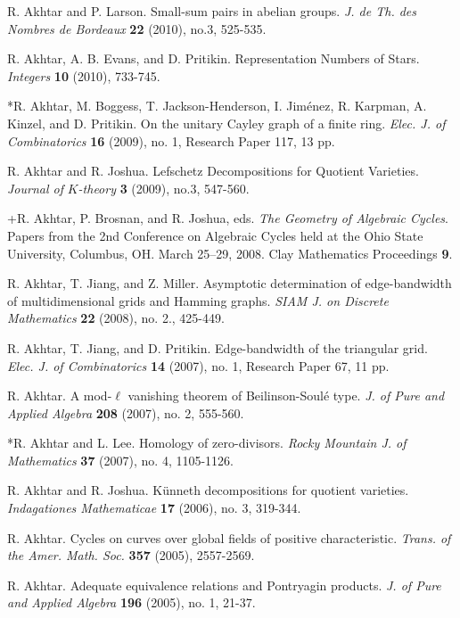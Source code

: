 \documentclass[overlapped,line,letterpaper]{res}
\begin{document}
\begin{resume}
\smallskip
R. Akhtar and P. Larson.  Small-sum pairs in abelian groups.  {\em J. de 
Th. des Nombres de Bordeaux} \textbf{22} (2010), no.3, 525-535.

\smallskip
R. Akhtar, A. B. Evans, and D. Pritikin.  Representation Numbers of Stars.  
 {\em Integers} \textbf{10} (2010), 733-745.


\smallskip
*R. Akhtar, M. Boggess, T. Jackson-Henderson, I. Jim\'{e}nez, R. Karpman, A. 
Kinzel, and D. Pritikin.  On the unitary Cayley graph of a finite ring.  
{\em Elec. J. of Combinatorics} \textbf{16} (2009), no. 1, Research Paper 117, 
13 pp.


\smallskip
R. Akhtar and R. Joshua.   Lefschetz Decompositions for Quotient Varieties. 
  {\em Journal of }$K${\em -theory} \textbf{3} (2009), no.3, 547-560.

\smallskip
+R. Akhtar, P. Brosnan, and R. Joshua, eds. {\em The Geometry of Algebraic Cycles}. 
Papers from the 2nd Conference on Algebraic Cycles held at the Ohio State 
University, Columbus, OH.   March 25–29, 2008. Clay Mathematics Proceedings 
\textbf{9}.


\smallskip
R. Akhtar, T. Jiang, and Z. Miller.  Asymptotic determination of 
edge-bandwidth of multidimensional grids and Hamming graphs.   
{\em SIAM J. on Discrete Mathematics} \textbf{22} (2008), no. 2., 425-449.

\smallskip
R. Akhtar, T. Jiang, and D. Pritikin.  Edge-bandwidth of the triangular 
grid. {\em Elec. J. of Combinatorics} \textbf{14} (2007), no. 1, Research Paper 67, 11 pp.

\smallskip
R. Akhtar.  A mod-$\ell$ vanishing theorem of Beilinson-Soul\'{e} 
type.  {\em J. of Pure and Applied Algebra} \textbf{208} (2007), no. 2, 555-560.

\smallskip
*R. Akhtar and L. Lee.  Homology of zero-divisors.  {\em Rocky Mountain 
J. of Mathematics} \textbf{37} (2007), no. 4, 1105-1126.

\smallskip
R. Akhtar and R. Joshua.  K\"{u}nneth decompositions for quotient 
varieties.  {\em Indagationes Mathematicae} \textbf{17} (2006), no. 3, 319-344.

\smallskip
R. Akhtar.  Cycles on curves over global fields of positive 
characteristic.  {\em Trans. of the Amer. Math. Soc.} \textbf{357} (2005), 2557-2569.     

\smallskip
R. Akhtar.  Adequate equivalence relations and Pontryagin products.  {\em 
J. of Pure and Applied Algebra} \textbf{196} (2005), no. 1, 21-37.     


\end{resume}
\end{document}
